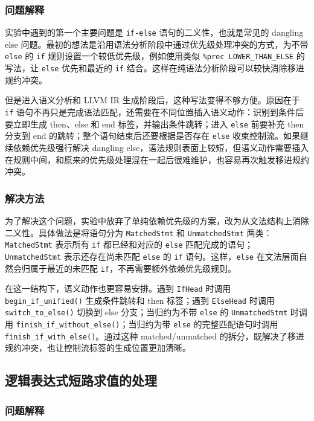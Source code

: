 \documentclass[12pt]{ctexart}
\begin{document}
\subsubsection{问题解释}

实验中遇到的第一个主要问题是 \texttt{if-else} 语句的二义性，也就是常见的 dangling else 问题。最初的想法是沿用语法分析阶段中通过优先级处理冲突的方式，为不带 \texttt{else} 的 \texttt{if} 规则设置一个较低优先级，例如使用类似 \texttt{\%prec LOWER\_THAN\_ELSE} 的写法，让 \texttt{else} 优先和最近的 \texttt{if} 结合。这样在纯语法分析阶段可以较快消除移进规约冲突。

但是进入语义分析和 LLVM IR 生成阶段后，这种写法变得不够方便。原因在于 \texttt{if} 语句不再只是完成语法匹配，还需要在不同位置插入语义动作：识别到条件后要立即生成 then、else 和 end 标签，并输出条件跳转；进入 \texttt{else} 前要补充 then 分支到 end 的跳转；整个语句结束后还要根据是否存在 \texttt{else} 收束控制流。如果继续依赖优先级强行解决 dangling else，语法规则表面上较短，但语义动作需要插入在规则中间，和原来的优先级处理混在一起后很难维护，也容易再次触发移进规约冲突。

\subsubsection{解决方法}

为了解决这个问题，实验中放弃了单纯依赖优先级的方案，改为从文法结构上消除二义性。具体做法是将语句分为 \texttt{MatchedStmt} 和 \texttt{UnmatchedStmt} 两类：\texttt{MatchedStmt} 表示所有 \texttt{if} 都已经和对应的 \texttt{else} 匹配完成的语句；\texttt{UnmatchedStmt} 表示还存在尚未匹配 \texttt{else} 的 \texttt{if} 语句。这样，\texttt{else} 在文法层面自然会归属于最近的未匹配 \texttt{if}，不再需要额外依赖优先级规则。

在这一结构下，语义动作也更容易安排。遇到 \texttt{IfHead} 时调用 \texttt{begin\_if\_unified()} 生成条件跳转和 then 标签；遇到 \texttt{ElseHead} 时调用 \texttt{switch\_to\_else()} 切换到 else 分支；当归约为不带 \texttt{else} 的 \texttt{UnmatchedStmt} 时调用 \texttt{finish\_if\_without\_else()}；当归约为带 \texttt{else} 的完整匹配语句时调用 \texttt{finish\_if\_with\_else()}。通过这种 matched/unmatched 的拆分，既解决了移进规约冲突，也让控制流标签的生成位置更加清晰。

\subsection{逻辑表达式短路求值的处理}

\subsubsection{问题解释}
\end{document}
